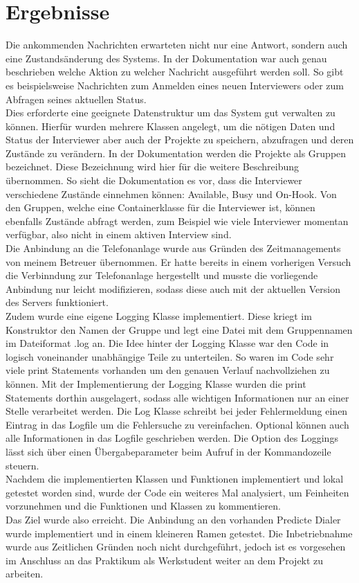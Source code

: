 \section{Ergebnisse}\label{sec:ergebnisse}
Die ankommenden Nachrichten erwarteten nicht nur eine Antwort, sondern auch eine Zustandsänderung des Systems. In der Dokumentation war auch genau beschrieben welche Aktion zu welcher Nachricht ausgeführt werden soll. So gibt es beispielsweise Nachrichten zum Anmelden eines neuen Interviewers oder zum Abfragen seines aktuellen Status. \\

Dies erforderte eine geeignete Datenstruktur um das System gut verwalten zu können. Hierfür wurden mehrere Klassen angelegt, um die nötigen Daten und Status der Interviewer aber auch der Projekte zu speichern, abzufragen und deren Zustände zu verändern. In der Dokumentation werden die Projekte als Gruppen bezeichnet. Diese Bezeichnung wird hier für die weitere Beschreibung übernommen. So sieht die Dokumentation es vor, dass die Interviewer verschiedene Zustände einnehmen können: Available, Busy und On-Hook. Von den Gruppen, welche eine Containerklasse für die Interviewer ist, können ebenfalls Zustände abfragt werden, zum Beispiel wie viele Interviewer momentan verfügbar, also nicht in einem aktiven Interview sind. \\

Die Anbindung an die Telefonanlage wurde aus Gründen des Zeitmanagements von meinem Betreuer übernommen. Er hatte bereits in einem vorherigen Versuch die Verbinndung zur Telefonanlage hergestellt und musste die vorliegende Anbindung nur leicht modifizieren, sodass diese auch mit der aktuellen Version des Servers funktioniert. \\

Zudem wurde eine eigene Logging Klasse implementiert. Diese kriegt im Konstruktor den Namen der Gruppe und legt eine Datei mit dem Gruppennamen im Dateiformat .log an. Die Idee hinter der Logging Klasse war den Code in logisch voneinander unabhängige Teile zu unterteilen. So waren im Code sehr viele print Statements vorhanden um den genauen Verlauf nachvollziehen zu können. Mit der Implementierung der Logging Klasse wurden die print Statements dorthin ausgelagert, sodass alle wichtigen Informationen nur an einer Stelle verarbeitet werden. Die Log Klasse schreibt bei jeder Fehlermeldung einen Eintrag in das Logfile um die Fehlersuche zu vereinfachen. Optional können auch alle Informationen in das Logfile geschrieben werden. Die Option des Loggings lässt sich über einen Übergabeparameter beim Aufruf in der Kommandozeile steuern. \\

Nachdem die implementierten Klassen und Funktionen implementiert und lokal getestet worden sind, wurde der Code ein weiteres Mal analysiert, um Feinheiten vorzunehmen und die Funktionen und Klassen zu kommentieren. \\

Das Ziel wurde also erreicht. Die Anbindung an den vorhanden Predicte Dialer wurde implementiert und in einem kleineren Ramen getestet. Die Inbetriebnahme wurde aus Zeitlichen Gründen noch nicht durchgeführt, jedoch ist es vorgesehen im Anschluss an das Praktikum als Werkstudent weiter an dem Projekt zu arbeiten. 
